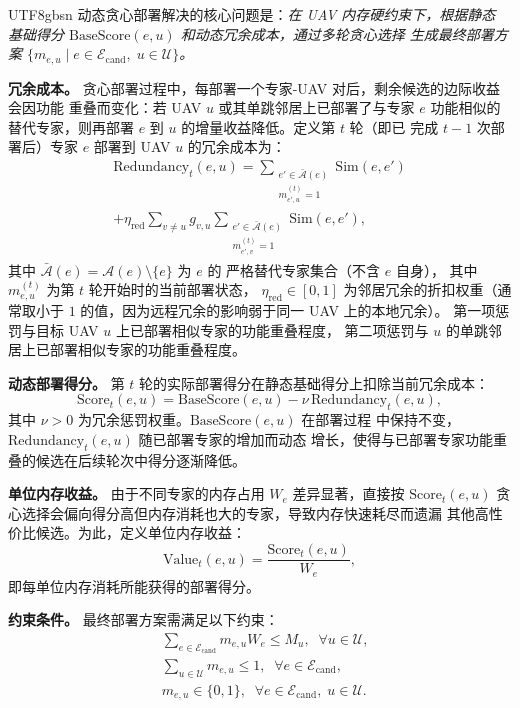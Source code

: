 \documentclass[conference]{IEEEtran}
\begin{document}
\begin{CJK*}{UTF8}{gbsn}
动态贪心部署解决的核心问题是：\emph{在 UAV 内存硬约束下，根据静态
基础得分 $\mathrm{BaseScore}(e,u)$ 和动态冗余成本，通过多轮贪心选择
生成最终部署方案 $\{m_{e,u}\mid e\in\mathcal{E}_{\mathrm{cand}},\;
u\in\mathcal{U}\}$。}

\textbf{冗余成本。}
贪心部署过程中，每部署一个专家-UAV 对后，剩余候选的边际收益会因功能
重叠而变化：若 UAV $u$ 或其单跳邻居上已部署了与专家 $e$ 功能相似的
替代专家，则再部署 $e$ 到 $u$ 的增量收益降低。定义第 $t$ 轮（即已
完成 $t-1$ 次部署后）专家 $e$ 部署到 UAV $u$ 的冗余成本为：
\begin{multline}
\mathrm{Redundancy}_t(e,u) =
\sum_{\substack{e'\in\bar{\mathcal{A}}(e)\\[-2pt] m_{e',u}^{(t)}=1}}
  \mathrm{Sim}(e,e') \\
+ \eta_{\mathrm{red}} \sum_{v\neq u} g_{v,u}
  \sum_{\substack{e'\in\bar{\mathcal{A}}(e)\\[-2pt] m_{e',v}^{(t)}=1}}
  \mathrm{Sim}(e,e'),
\label{eq:redundancy}
\end{multline}
其中 $\bar{\mathcal{A}}(e) = \mathcal{A}(e)\setminus\{e\}$ 为 $e$ 的
严格替代专家集合（不含 $e$ 自身），
其中 $m_{e,u}^{(t)}$ 为第 $t$ 轮开始时的当前部署状态，
$\eta_{\mathrm{red}}\in[0,1]$ 为邻居冗余的折扣权重（通常取小于 $1$
的值，因为远程冗余的影响弱于同一 UAV 上的本地冗余）。
第一项惩罚与目标 UAV $u$ 上已部署相似专家的功能重叠程度，
第二项惩罚与 $u$ 的单跳邻居上已部署相似专家的功能重叠程度。

\textbf{动态部署得分。}
第 $t$ 轮的实际部署得分在静态基础得分上扣除当前冗余成本：
\begin{equation}
\mathrm{Score}_t(e,u) = \mathrm{BaseScore}(e,u) -
\nu\,\mathrm{Redundancy}_t(e,u),
\label{eq:score_t}
\end{equation}
其中 $\nu > 0$ 为冗余惩罚权重。$\mathrm{BaseScore}(e,u)$ 在部署过程
中保持不变，$\mathrm{Redundancy}_t(e,u)$ 随已部署专家的增加而动态
增长，使得与已部署专家功能重叠的候选在后续轮次中得分逐渐降低。

\textbf{单位内存收益。}
由于不同专家的内存占用 $W_e$ 差异显著，直接按 $\mathrm{Score}_t(e,u)$
贪心选择会偏向得分高但内存消耗也大的专家，导致内存快速耗尽而遗漏
其他高性价比候选。为此，定义单位内存收益：
\begin{equation}
\mathrm{Value}_t(e,u) = \frac{\mathrm{Score}_t(e,u)}{W_e},
\label{eq:value_t}
\end{equation}
即每单位内存消耗所能获得的部署得分。

\textbf{约束条件。}
最终部署方案需满足以下约束：
\begin{align}
&\sum_{e\in\mathcal{E}_{\mathrm{cand}}} m_{e,u} W_e \le M_u,
\;\; \forall u\in\mathcal{U},
\label{eq:memory_constraint}\\
&\sum_{u\in\mathcal{U}} m_{e,u} \le 1,
\;\; \forall e\in\mathcal{E}_{\mathrm{cand}},
\label{eq:single_copy}\\
&m_{e,u} \in \{0,1\},
\;\; \forall e\in\mathcal{E}_{\mathrm{cand}},\;u\in\mathcal{U}.
\label{eq:binary_m}
\end{align}


\end{CJK*}
\end{document}
